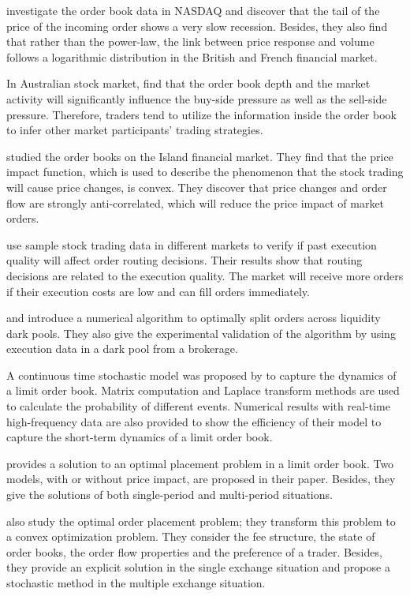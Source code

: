 \cite{potters2003more} investigate the order book data in NASDAQ and discover that the tail of the price of the incoming order shows a very slow recession. Besides, they also find that rather than the power-law, the link between price response and volume follows a logarithmic distribution in the British and French financial market.

In Australian stock market, \cite{hall2004continuous} find that the order book depth and the market activity will significantly influence the buy-side pressure as well as the sell-side pressure. Therefore, traders tend to utilize the information inside the order book to infer other market participants' trading strategies. 

\cite{weber2005order} studied the order books on the Island financial market. They find that the price impact function, which is used to describe the phenomenon that the stock trading will cause price changes, is convex. They discover that price changes and order flow are strongly anti-correlated, which will reduce the price impact of market orders. 

\cite{boehmer2007public} use sample stock trading data in different markets to verify if past execution quality will affect order routing decisions. Their results show that routing decisions are related to the execution quality. The market will receive more orders if their execution costs are low and can fill orders immediately. 

\cite{ganchev2010censored} and \cite{laruelle2011optimal} introduce a numerical algorithm to optimally split orders across liquidity dark pools. They also give the experimental validation of the algorithm by using execution data in a dark pool from a brokerage.

A continuous time stochastic model was proposed by \cite{cont2010stochastic} to capture the dynamics of a limit order book. Matrix computation and Laplace transform methods are used to calculate the probability of different events. Numerical results with real-time high-frequency data are also provided to show the efficiency of their model to capture the short-term dynamics of a limit order book. 

\cite{guo2013optimal} provides a solution to an optimal placement problem in a limit order book. Two models, with or without price impact, are proposed in their paper. Besides, they give the solutions of both single-period and multi-period situations.   

\cite{cont2013optimal} also study the optimal order placement problem; they transform this problem to a convex optimization problem. They consider the fee structure, the state of order books, the order flow properties and the preference of a trader. Besides, they provide an explicit solution in the single exchange situation and propose a stochastic method in the multiple exchange situation. 


